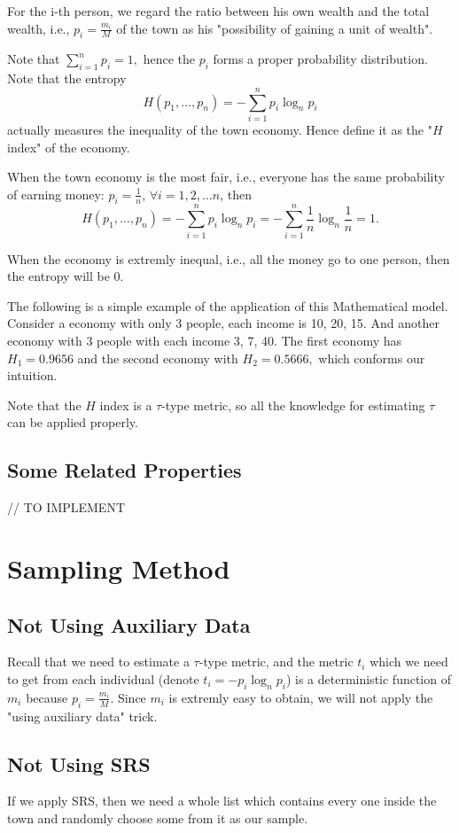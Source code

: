 \documentclass[12pt]{article}%
\begin{document}
For the i-th person, we regard the ratio between his own wealth and the total wealth, i.e., $p_i=\frac{m_i}{M}$ of the town as his "possibility of gaining a unit of wealth".

Note that $\sum_{i=1}^{n}p_i=1,$ hence the $p_i$ forms a proper probability distribution. Note that the entropy $$H(p_1,\dots,p_n)=-\sum_{i=1}^{n}p_i\log_{n}{p_i}$$ actually measures the 
inequality of the town economy. Hence define it as the "$H$ index" of the economy.

When the town economy is the most fair, i.e., everyone has the same probability of earning money: $p_i=\frac{1}{n}$, $\forall i=1,2,\dots n$, then $$H(p_1,\dots, p_n)=-\sum_{i=1}^{n}p_i\log_{n}{p_i}=-\sum_{i=1}^{n}\frac{1}{n}\log_{n}{\frac{1}{n}}=1.$$ 

When the economy is extremly inequal, i.e., all the money go to one person, then the entropy will be 0.

The following is a simple example of the application of this Mathematical model. Consider a economy with only 3 people, each income is 10, 20, 15. 
And another economy with 3 people with each income  3, 7, 40. The first economy has $H_1=0.9656$ and the second economy with $H_2=0.5666,$ which conforms our intuition.


Note that the $H$ index is a $\tau$-type metric, so all the knowledge for estimating $\tau$ can be applied properly.

\subsection{Some Related Properties}

// TO IMPLEMENT


\section{Sampling Method}

\subsection{Not Using Auxiliary Data}
Recall that we need to estimate a $\tau$-type metric, and the metric $t_i$ which we need to get from each individual (denote $t_i=-p_i\log_{n}{p_i}$) is a deterministic function of $m_i$ because $p_i=\frac{m_i}{M}$.
Since $m_i$ is extremly easy to obtain, we will not apply the "using auxiliary data" trick.

\subsection{Not Using SRS}
If we apply SRS, then we need a whole list which contains every one inside the town and randomly choose some from it as our sample.
\end{document}
